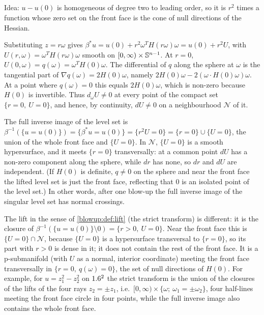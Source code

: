 \subsection*{}
Idea: $u-u(0)$ is homogeneous of degree two to leading order, so it is $r^2$ times a
function whose zero set on the front face is the cone of null directions of the Hessian.

Substituting $z=r\omega$ gives $\beta^*u=u(0)+r^2\omega^TH(r\omega)\omega=u(0)+r^2U$, with
$U(r,\omega)=\omega^TH(r\omega)\omega$ smooth on $[0,\infty)\times\mathbb{S}^{n-1}$. At $r=0$,
$U(0,\omega)=q(\omega)=\omega^TH(0)\omega$. The differential of $q$ along the sphere at $\omega$ is the
tangential part of $\nabla q(\omega)=2H(0)\omega$, namely $2H(0)\omega-2(\omega\cdot H(0)\omega)\omega$. At a
point where $q(\omega)=0$ this equals $2H(0)\omega$, which is non-zero because $H(0)$ is invertible.
Thus $d_\omega U\ne0$ at every point of the compact set $\{r=0,\ U=0\}$, and hence, by continuity,
$dU\ne0$ on a neighbourhood $\mathcal N$ of it.

The full inverse image of the level set is
$\beta^{-1}(\{u=u(0)\})=\{\beta^*u=u(0)\}=\{r^2U=0\}=\{r=0\}\cup\{U=0\}$, the union of the whole
front face and $\{U=0\}$. In $\mathcal N$,
$\{U=0\}$ is a smooth hypersurface, and it meets $\{r=0\}$ transversally: at a common point
$dU$ has a non-zero component along the sphere, while $dr$ has none, so $dr$ and $dU$ are
independent. (If $H(0)$ is definite, $q\ne0$ on the sphere and near the front face the lifted
level set is just the front face, reflecting that $0$ is an isolated point of the level set.)
In other words, after one blow-up the full inverse image of the singular level set has normal
crossings.

The lift in the sense of \cref{blowup:def:lift} (the strict transform) is different: it is the
closure of $\beta^{-1}(\{u=u(0)\}\setminus0)=\{r>0,\ U=0\}$. Near the front face this is
$\{U=0\}\cap\mathcal N$, because $\{U=0\}$ is a hypersurface transversal to $\{r=0\}$, so its
part with $r>0$ is dense in it; it does not contain the rest of the front face. It is a
p-submanifold (with $U$ as a normal, interior coordinate) meeting the front face transversally in
$\{r=0,\ q(\omega)=0\}$, the set of null directions of $H(0)$. For example, for
$u=z_1^2-z_2^2$ on $1.6^2$ the strict transform is the union of the closures of the lifts of the
four rays $z_2=\pm z_1$, i.e.\ $[0,\infty)\times\{\omega;\ \omega_1=\pm\omega_2\}$, four half-lines meeting
the front face circle in four points, while the full inverse image also contains the whole
front face.

